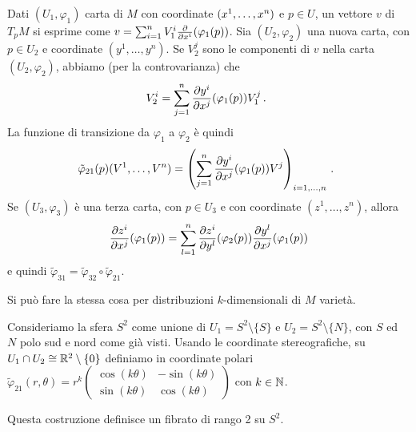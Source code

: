 \begin{example}
	 Dati $(U_1,\varphi_1)$ carta di $M$ con coordinate $(\seqa xn,)$ e $p\in U$, un vettore $v$ di $T_pM$ si esprime come $v = \sum_{i=1}^n V^i_1\DerParz{}{x^i}(\varphi_1(p))$. Sia $(U_2, \varphi_2)$ una nuova carta, con $p\in U_2$ e coordinate $(y^1,\dots, y^n)$.
	 Se $V^j_2$ sono le componenti di $v$ nella carta $(U_2,\varphi_2)$, abbiamo (per la controvarianza) che
	 \begin{equation*}
	 	V^i_2 = \sum_{j=1}^n \DerParz{y^i}{x^j}(\varphi_1(p))V^j_1\punto
	 \end{equation*}
	 La funzione di transizione da $\varphi_1$ a $\varphi_2$ è quindi
	 \begin{equation*}
	 \tilde\varphi_{21}(p)(V^1,\dots,V^n) = \left(\sum_{j=1}^n \DerParz{y^i}{x^j}(\varphi_1(p))V^j\right)_{i=1,\dots,n}\punto
	 \end{equation*}
	 Se $(U_3, \varphi_3)$ è una terza carta, con $p\in U_3$ e con coordinate $(z^1,\dots,z^n)$, allora
	 \begin{equation*}
	 	\DerParz{z^i}{x^j}(\varphi_1(p)) = \sum_{l=1}^n \DerParz{z^i}{y^l}(\varphi_2(p)) \DerParz{y^l}{x^j}(\varphi_1(p))  
	 \end{equation*}
	e quindi $\tilde\varphi_{31}=\tilde\varphi_{32}\circ \tilde\varphi_{21}$.
	
	Si può fare la stessa cosa per distribuzioni $k$-dimensionali di $M$ varietà.
	
\end{example}

\begin{example}
	Consideriamo la sfera $S^2$ come unione di $U_1 = S^2\setminus \{S\}$ e $U_2 = S^2\setminus \{N\}$, con $S$ ed $N$ polo sud e nord come già visti. Usando le coordinate stereografiche, su $U_1\cap U_2\cong \R^2\setminus\{0\}$ definiamo in coordinate polari $\tilde\varphi_{21}(r,\theta) = r^k \left(\begin{matrix} \cos(k\theta)& -\sin(k\theta)\\ \sin(k\theta)& \cos(k\theta) \end{matrix}\right)$ con $k\in\N$.
	
	Questa costruzione definisce un fibrato di rango 2 su $S^2$.
\end{example}



